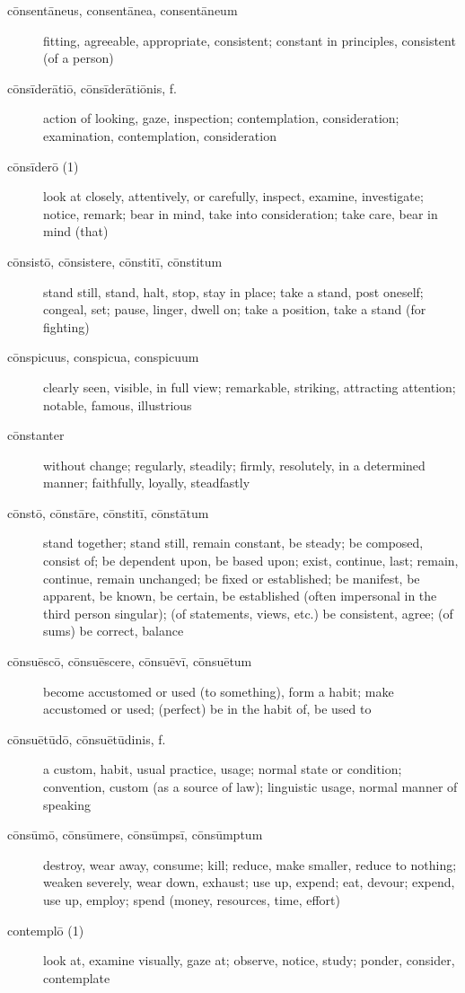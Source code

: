 \begin{description}
    \item[cōnsentāneus, consentānea, consentāneum] fitting, agreeable, appropriate, consistent; constant in principles, consistent (of a person)
    \item[cōnsīderātiō, cōnsīderātiōnis, f.] action of looking, gaze, inspection; contemplation, consideration; examination, contemplation, consideration
    \item[cōnsīderō (1)] look at closely, attentively, or carefully, inspect, examine, investigate; notice, remark; bear in mind, take into consideration; take care, bear in mind (that)
    \item[cōnsistō, cōnsistere, cōnstitī, cōnstitum] stand still, stand, halt, stop, stay in place; take a stand, post oneself; congeal, set; pause, linger, dwell on; take a position, take a stand (for fighting)
    \item[cōnspicuus, conspicua, conspicuum] clearly seen, visible, in full view; remarkable, striking, attracting attention; notable, famous, illustrious
    \item[cōnstanter] without change; regularly, steadily; firmly, resolutely, in a determined manner; faithfully, loyally, steadfastly
    \item[cōnstō, cōnstāre, cōnstitī, cōnstātum] stand together; stand still, remain constant, be steady; be composed, consist of; be dependent upon, be based upon; exist, continue, last; remain, continue, remain unchanged; be fixed or established; be manifest, be apparent, be known, be certain, be established (often impersonal in the third person singular); (of statements, views, etc.) be consistent, agree; (of sums) be correct, balance
    \item[cōnsuēscō, cōnsuēscere, cōnsuēvī, cōnsuētum]  become accustomed or used (to something), form a habit; make accustomed or used; (perfect) be in the habit of, be used to
    \item[cōnsuētūdō, cōnsuētūdinis, f.] a custom, habit, usual practice, usage; normal state or condition; convention, custom (as a source of law); linguistic usage, normal manner of speaking
    \item[cōnsūmō, cōnsūmere, cōnsūmpsī, cōnsūmptum] destroy, wear away, consume; kill; reduce, make smaller, reduce to nothing; weaken severely, wear down, exhaust; use up, expend; eat, devour; expend, use up, employ; spend (money, resources, time, effort)
    \item[contemplō (1)] look at, examine visually, gaze at; observe, notice, study; ponder, consider, contemplate

\end{description}
